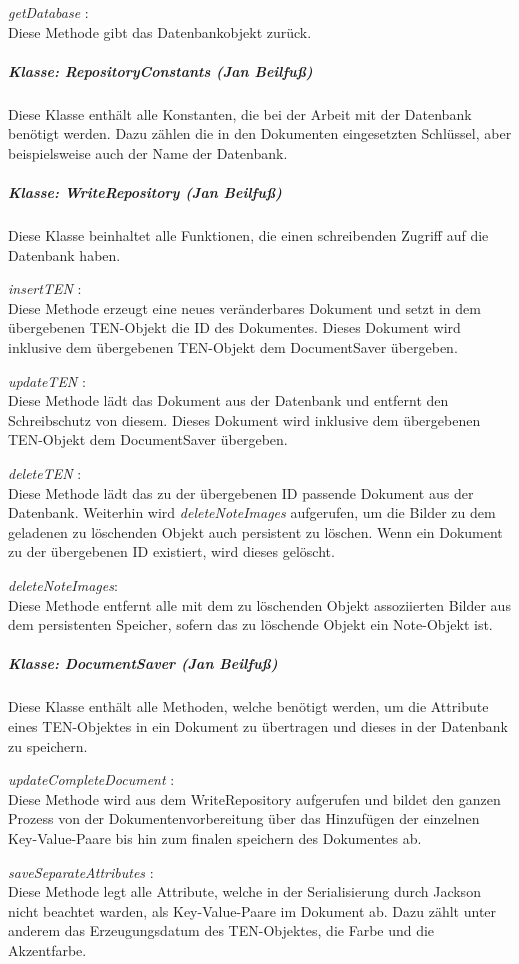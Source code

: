 \textit{ getDatabase }:\\
Diese Methode gibt das Datenbankobjekt zurück.

\subparagraph{Klasse: RepositoryConstants (Jan Beilfuß)}
Diese Klasse enthält alle Konstanten, die bei der Arbeit mit der Datenbank benötigt werden. Dazu zählen die in den Dokumenten eingesetzten Schlüssel, aber beispielsweise auch der Name der Datenbank.

\subparagraph{Klasse: WriteRepository (Jan Beilfuß)}
Diese Klasse beinhaltet alle Funktionen, die einen schreibenden Zugriff auf die Datenbank haben. 

\textit{ insertTEN }:\\
Diese Methode erzeugt eine neues veränderbares Dokument und setzt in dem übergebenen TEN-Objekt die ID des Dokumentes. Dieses Dokument wird inklusive dem übergebenen TEN-Objekt dem DocumentSaver übergeben.

\textit{ updateTEN }:\\
Diese Methode lädt das Dokument aus der Datenbank und entfernt den Schreibschutz von diesem. Dieses Dokument wird inklusive dem übergebenen TEN-Objekt dem DocumentSaver übergeben.

\textit{ deleteTEN }:\\
Diese Methode lädt das zu der übergebenen ID passende Dokument aus der Datenbank. Weiterhin wird \textit{deleteNoteImages} aufgerufen, um die Bilder zu dem geladenen zu löschenden Objekt auch persistent zu löschen. Wenn ein Dokument zu der übergebenen ID existiert, wird dieses gelöscht.

\textit{ deleteNoteImages}:\\
Diese Methode entfernt alle mit dem zu löschenden Objekt assoziierten Bilder aus dem persistenten Speicher, sofern das zu löschende Objekt ein Note-Objekt ist.

\subparagraph{Klasse: DocumentSaver (Jan Beilfuß)}
Diese Klasse enthält alle Methoden, welche benötigt werden, um die Attribute eines TEN-Objektes in ein Dokument zu übertragen und dieses in der Datenbank zu speichern.

\textit{ updateCompleteDocument }:\\
Diese Methode wird aus dem WriteRepository aufgerufen und bildet den ganzen Prozess von der Dokumentenvorbereitung über das Hinzufügen der einzelnen Key-Value-Paare bis hin zum finalen speichern des Dokumentes ab.

\textit{ saveSeparateAttributes }:\\
Diese Methode legt alle Attribute, welche in der Serialisierung durch Jackson nicht beachtet warden, als Key-Value-Paare im Dokument ab. Dazu zählt unter anderem das Erzeugungsdatum des TEN-Objektes, die Farbe und die Akzentfarbe.

